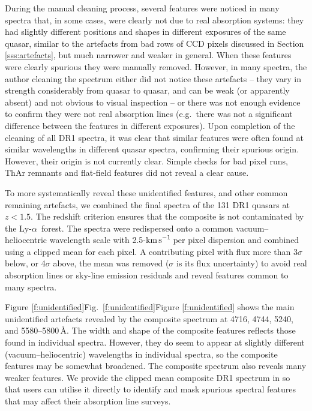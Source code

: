 \documentclass[fleqn,usenatbib,usedcolumn]{mnras}
\newcommand{\Sref}[1]{Section \ref{#1}}
\newcommand{\Fref}[1]{\ifhmode \ifnum\spacefactor=1001 Figure \ref{#1}\else Fig.\ \ref{#1}\fi \else Figure \ref{#1}\fi}
\newcommand{\kms}{\ensuremath{\textrm{km\,s}^{-1}}}
\newcommand{\lya}{\ensuremath{\textrm{Ly-}\alpha}}
\begin{document}
During the manual cleaning process, several features were noticed in many spectra that, in some cases, were clearly not due to real absorption systems: they had slightly different positions and shapes in different exposures of the same quasar, similar to the artefacts from bad rows of CCD pixels discussed in \Sref{sss:artefacts}, but much narrower and weaker in general. When these features were clearly spurious they were manually removed. However, in many spectra, the author cleaning the spectrum either did not notice these artefacts -- they vary in strength considerably from quasar to quasar, and can be weak (or apparently absent) and not obvious to visual inspection -- or there was not enough evidence to confirm they were not real absorption lines (e.g.\ there was not a significant difference between the features in different exposures). Upon completion of the cleaning of all DR1 spectra, it was clear that similar features were often found at similar wavelengths in different quasar spectra, confirming their spurious origin. However, their origin is not currently clear. Simple checks for bad pixel runs, ThAr remnants and flat-field features did not reveal a clear cause.

To more systematically reveal these unidentified features, and other common remaining artefacts, we combined the final spectra of the 131 DR1 quasars at $z<1.5$. The redshift criterion ensures that the composite is not contaminated by the \lya\ forest. The spectra were redispersed onto a common vacuum--heliocentric wavelength scale with 2.5-\kms\,per pixel dispersion and combined using a clipped mean for each pixel. A contributing pixel with flux more than 3$\sigma$ below, or 4$\sigma$ above, the mean was removed ($\sigma$ is its flux uncertainty) to avoid real absorption lines or sky-line emission residuals and reveal features common to many spectra.

\Fref{f:unidentified} shows the main unidentified artefacts revealed by the composite spectrum at 4716, 4744, 5240, and 5580--5800\,\AA. The width and shape of the composite features reflects those found in individual spectra. However, they do seem to appear at slightly different (vacuum--heliocentric) wavelengths in individual spectra, so the composite features may be somewhat broadened. The composite spectrum also reveals many weaker features. We provide the clipped mean composite DR1 spectrum in \citet{Murphy:2018:UVESSQUADDR1} so that users can utilise it directly to identify and mask spurious spectral features that may affect their absorption line surveys.
\end{document}
